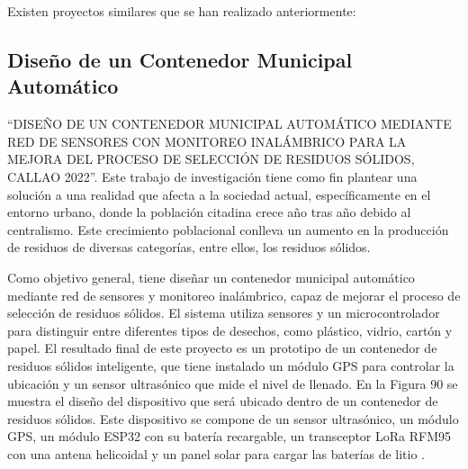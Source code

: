 
Existen proyectos similares que se han realizado anteriormente:

\subsection{Diseño de un Contenedor Municipal Automático}
“DISEÑO DE UN CONTENEDOR MUNICIPAL AUTOMÁTICO MEDIANTE RED DE SENSORES CON MONITOREO INALÁMBRICO PARA LA MEJORA DEL PROCESO DE SELECCIÓN DE RESIDUOS SÓLIDOS, CALLAO 2022”. Este trabajo de investigación tiene como fin plantear una solución a una realidad que afecta a la sociedad actual, específicamente en el entorno urbano, donde la población citadina crece año tras año debido al centralismo. Este crecimiento poblacional conlleva un aumento en la producción de residuos de diversas categorías, entre ellos, los residuos sólidos. 

Como objetivo general, tiene diseñar un contenedor municipal automático mediante red de sensores y monitoreo inalámbrico, capaz de mejorar el proceso de selección de residuos sólidos. El sistema utiliza sensores y un microcontrolador para distinguir entre diferentes tipos de desechos, como plástico, vidrio, cartón y papel. El resultado final de este proyecto es un prototipo de un contenedor de residuos sólidos inteligente, que tiene instalado un módulo GPS para controlar la ubicación y un sensor ultrasónico que mide el nivel de llenado. En la Figura 90 se muestra el diseño del dispositivo que será ubicado dentro de un contenedor de residuos sólidos. Este dispositivo se compone de un sensor ultrasónico, un módulo GPS, un módulo ESP32 con su batería recargable, un transceptor LoRa RFM95 con una antena helicoidal y un panel solar para cargar las baterías de litio \cite{manrique}.

